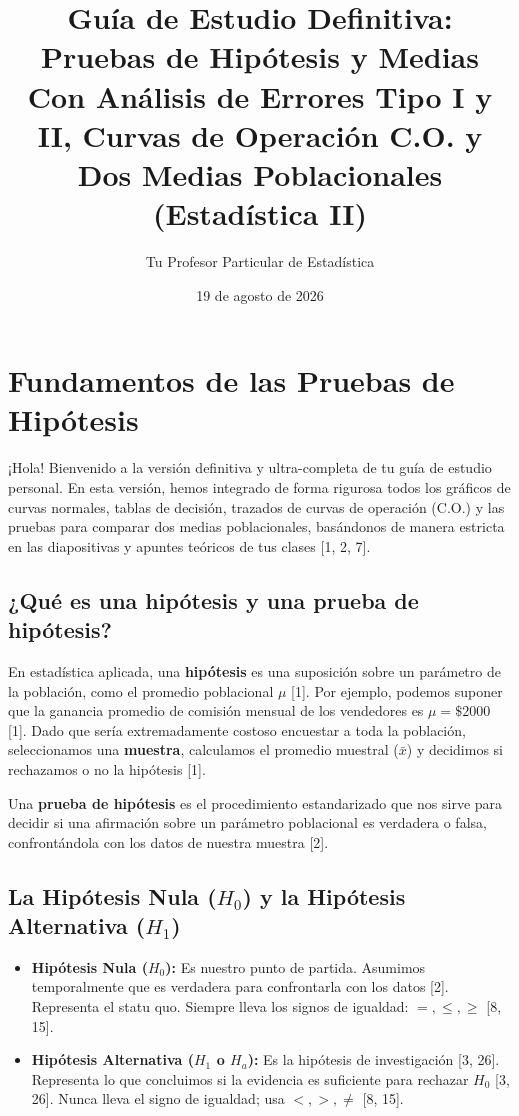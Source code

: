 \documentclass{article}
\title{\sffamily\bfseries Guía de Estudio Definitiva: Pruebas de Hipótesis y Medias \\ \large Con Análisis de Errores Tipo I y II, Curvas de Operación C.O. y Dos Medias Poblacionales (Estadística II)}
\author{Tu Profesor Particular de Estadística}
\date{19 de agosto de 2026}
\begin{document}
\maketitle

\tableofcontents
\newpage

\section{Fundamentos de las Pruebas de Hipótesis}

¡Hola! Bienvenido a la versión definitiva y ultra-completa de tu guía de estudio personal. En esta versión, hemos integrado de forma rigurosa todos los gráficos de curvas normales, tablas de decisión, trazados de curvas de operación (C.O.) y las pruebas para comparar dos medias poblacionales, basándonos de manera estricta en las diapositivas y apuntes teóricos de tus clases [1, 2, 7].

\subsection{¿Qué es una hipótesis y una prueba de hipótesis?}

En estadística aplicada, una \textbf{hipótesis} es una suposición sobre un parámetro de la población, como el promedio poblacional $\mu$ [1]. Por ejemplo, podemos suponer que la ganancia promedio de comisión mensual de los vendedores es $\mu = \$2000$ [1]. Dado que sería extremadamente costoso encuestar a toda la población, seleccionamos una \textbf{muestra}, calculamos el promedio muestral ($\bar{x}$) y decidimos si rechazamos o no la hipótesis [1].

Una \textbf{prueba de hipótesis} es el procedimiento estandarizado que nos sirve para decidir si una afirmación sobre un parámetro poblacional es verdadera o falsa, confrontándola con los datos de nuestra muestra [2].

\subsection{La Hipótesis Nula ($H_0$) y la Hipótesis Alternativa ($H_1$)}

\begin{itemize}
    \item \textbf{Hipótesis Nula ($H_0$):} Es nuestro punto de partida. Asumimos temporalmente que es verdadera para confrontarla con los datos [2]. Representa el statu quo. Siempre lleva los signos de igualdad: $=, \le, \ge$ [8, 15].
    \item \textbf{Hipótesis Alternativa ($H_1$ o $H_a$):} Es la hipótesis de investigación [3, 26]. Representa lo que concluimos si la evidencia es suficiente para rechazar $H_0$ [3, 26]. Nunca lleva el signo de igualdad; usa $<, >, \neq$ [8, 15].
\end{itemize}
\end{document}
